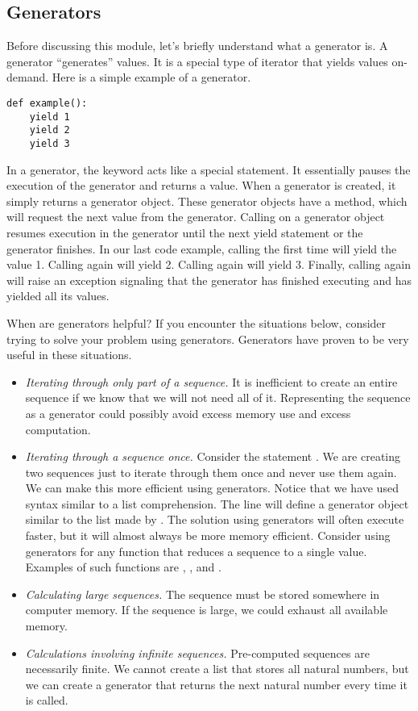 \subsection*{Generators}
Before discussing this module, let's briefly understand what a generator is.
A generator ``generates'' values.  It is a special type of iterator that yields values on-demand.  Here is a simple example of a generator.
\begin{lstlisting}
def example():
    yield 1
    yield 2
    yield 3
\end{lstlisting}
In a generator, the  keyword acts like a special  statement.  
It essentially pauses the execution of the generator and returns a value.
When a generator is created, it simply returns a generator object.
These generator objects have a  method, which will request the next value from the generator.
Calling  on a generator object resumes execution in the generator until the next yield statement or the generator finishes.
In our last code example, calling  the first time will yield the value 1.  Calling  again will yield 2.  Calling  again will yield 3.  Finally, calling  again will raise an exception signaling that the generator has finished executing and has yielded all its values.

When are generators helpful? 
If you encounter the situations below, consider trying to solve 
your problem using generators.
Generators have proven to be very useful in these situations.
\begin{itemize}
\item \emph{Iterating through only part of a sequence.}
It is inefficient to create an entire sequence if we know that we will not need all of it.
Representing the sequence as a generator could possibly avoid excess memory use and excess computation.
\item \emph{Iterating through a sequence once.} Consider the statement 
.
We are creating two sequences just to iterate through them once and never use them again.
We can make this more efficient using generators.
Notice that we have used syntax similar to a list comprehension.
The line  will define a generator object similar to the list made by \li{[i for i in xrange(1000) if i\%2 == 0]}.
The solution using generators will often execute faster, but it will almost always be more memory efficient.  Consider using generators for any function that reduces a sequence to a single value.  Examples of such functions are , , and .
\item \emph{Calculating large sequences.}  The sequence must be stored somewhere in computer memory.
If the sequence is large, we could exhaust all available memory.
\item \emph{Calculations involving infinite sequences.}  Pre-computed sequences are necessarily finite.  We cannot create a list that stores all natural numbers, but we can create a generator that returns the next natural number every time it is called.
\end{itemize}

